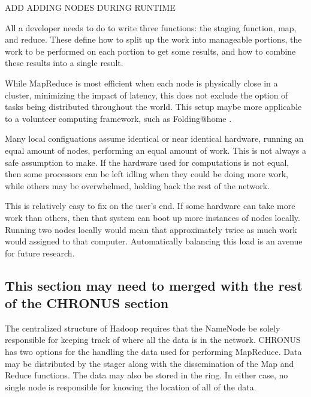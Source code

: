 \documentclass[conference, compsocconf, letterpaper]{IEEEtran}
\begin{document}
ADD ADDING NODES DURING RUNTIME


All a developer needs to do to write three functions: the staging function, map, and reduce.  These define how to split up the work into manageable portions,  the  work to be performed on each portion to get some results, and how to combine these results into a single result. 

While MapReduce is most efficient when each node is physically close in a cluster, minimizing the impact of latency, this does not exclude the option of tasks being distributed throughout the world.  This setup maybe more applicable to a volunteer computing framework, such as Folding@home \cite{folding}.

Many local configuations assume identical or near identical hardware, running an equal amount of nodes, performing an equal amount of work. This is not always a safe assumption to make.  If the hardware used for computations is not equal, then some processors can be left idling when they could be doing more work, while others may be overwhelmed, holding back the rest of the network.

This is relatively easy to fix on the user's end.  If some hardware can take more work than others, then that system can boot up more instances of nodes locally. Running two nodes locally would mean that approximately twice as much work would assigned to that computer.  Automatically balancing this load is an avenue for future research.




\subsection{This section may need to merged  with the rest of the CHRONUS section}

The centralized structure of Hadoop requires that the NameNode be solely responsible for keeping track of where all the data is in the network\cite{Hadoop}.  CHRONUS has two options for the handling the data used for performing MapReduce.  Data may be distributed by the stager along with the dissemination of the Map and Reduce functions.  The data may also be stored in the ring\cite{CFS}.  In either case, no single node is responsible for knowing the location of all of the data.  
\end{document}
